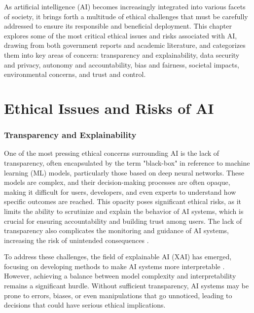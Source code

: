 

As artificial intelligence (AI) becomes increasingly integrated into various facets of society, it brings forth a multitude of ethical challenges that must be carefully addressed to ensure its responsible and beneficial deployment. This chapter explores some of the most critical ethical issues and risks associated with AI, drawing from both government reports and academic literature, and categorizes them into key areas of concern: transparency and explainability, data security and privacy, autonomy and accountability, bias and fairness, societal impacts, environmental concerns, and trust and control.

\section{Ethical Issues and Risks of AI}


\subsubsection{Transparency and Explainability}

One of the most pressing ethical concerns surrounding AI is the lack of transparency, often encapsulated by the term "black-box" in reference to machine learning (ML) models, particularly those based on deep neural networks. These models are complex, and their decision-making processes are often opaque, making it difficult for users, developers, and even experts to understand how specific outcomes are reached. This opacity poses significant ethical risks, as it limits the ability to scrutinize and explain the behavior of AI systems, which is crucial for ensuring accountability and building trust among users. The lack of transparency also complicates the monitoring and guidance of AI systems, increasing the risk of unintended consequences \cite{huang2022overview}.

To address these challenges, the field of explainable AI (XAI) has emerged, focusing on developing methods to make AI systems more interpretable \cite{molnar2020interpretable}. However, achieving a balance between model complexity and interpretability remains a significant hurdle. Without sufficient transparency, AI systems may be prone to errors, biases, or even manipulations that go unnoticed, leading to decisions that could have serious ethical implications.


